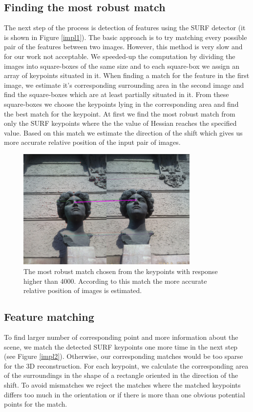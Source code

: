 \subsection{Finding the most robust match}
The next step of the process is detection of features using the SURF detector (it is shown in Figure \ref{impl1}).
The basic approach is to try matching every possible pair of the features between two images.
However, this method is very slow and for our work not acceptable.
We speeded-up the computation by dividing the images into square-boxes of the same size and to each square-box we assign an array of keypoints situated in it.
When finding a match for the feature in the first image, we estimate it's corresponding surrounding area in the second image 
and find the square-boxes which are at least partially situated in it.
From these square-boxes we choose the keypoints lying in the corresponding area and find the best match for the keypoint.
At first we find the most robust match from only the SURF keypoints where the the value of Hessian reaches the specified value.
Based on this match we estimate the direction of the shift which gives us more accurate relative position of the input pair of images.

\begin{figure}[H]
\centerline{
\includegraphics[width=9cm]{img/ema_direction.png}}
\caption{The most robust match chosen from the keypoints with response higher than 4000. According to this match the more accurate relative position of images is estimated.}
\label{fig:robust_match}
\end{figure}

\subsection{Feature matching}
To find larger number of corresponding point and more information about the scene, we match the detected SURF keypoints one more time in the next step (see Figure \ref{impl2}).
Otherwise, our corresponding matches would be too sparse for the 3D reconstruction.
For each keypoint, we calculate the corresponding area of the surroundings in the shape of a rectangle oriented in the direction of the shift.
To avoid mismatches we reject the matches where the matched keypoints differs too much in the orientation or if there is more than one obvious potential points for the match.

